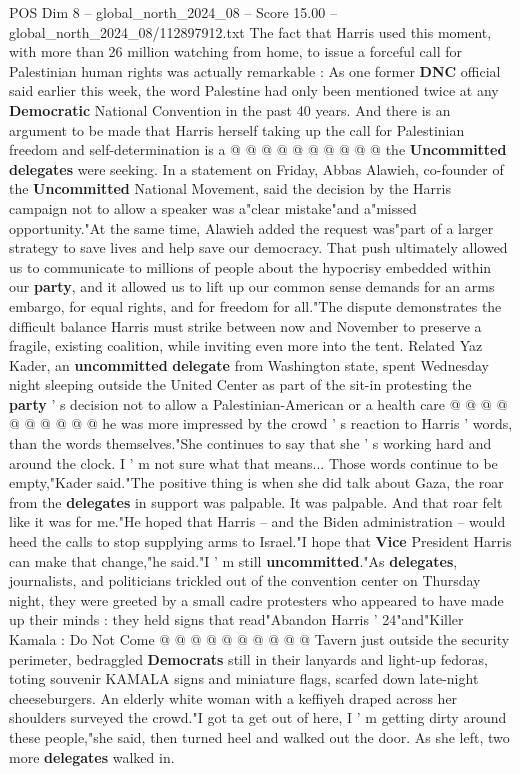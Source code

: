 \begin{textsample}{POS Dim 8 – global\_north\_2024\_08 – Score 15.00 – global\_north\_2024\_08/112897912.txt}
The fact that Harris used this moment, with more than 26 million watching from home, to issue a forceful call for Palestinian human rights was actually remarkable : As one former \textbf{DNC} official said earlier this week, the word Palestine had only been mentioned twice at any \textbf{Democratic} National Convention in the past 40 years.
And there is an argument to be made that Harris herself taking up the call for Palestinian freedom and self-determination is a @ @ @ @ @ @ @ @ @ @ the \textbf{Uncommitted} \textbf{delegates} were seeking.
In a statement on Friday, Abbas Alawieh, co-founder of the \textbf{Uncommitted} National Movement, said the decision by the Harris campaign not to allow a speaker was a"clear mistake"and a"missed opportunity."At the same time, Alawieh added the request was"part of a larger strategy to save lives and help save our democracy.
That push ultimately allowed us to communicate to millions of people about the hypocrisy embedded within our \textbf{party}, and it allowed us to lift up our common sense demands for an arms embargo, for equal rights, and for freedom for all."The dispute demonstrates the difficult balance Harris must strike between now and November to preserve a fragile, existing coalition, while inviting even more into the tent.
Related Yaz Kader, an \textbf{uncommitted} \textbf{delegate} from Washington state, spent Wednesday night sleeping outside the United Center as part of the sit-in protesting the \textbf{party} ' s decision not to allow a Palestinian-American or a health care @ @ @ @ @ @ @ @ @ @ he was more impressed by the crowd ' s reaction to Harris ' words, than the words themselves."She continues to say that she ' s working hard and around the clock.
I ' m not sure what that means...
Those words continue to be empty,"Kader said."The positive thing is when she did talk about Gaza, the roar from the \textbf{delegates} in support was palpable.
It was palpable.
And that roar felt like it was for me."He hoped that Harris -- and the Biden administration -- would heed the calls to stop supplying arms to Israel."I hope that \textbf{Vice} President Harris can make that change,"he said."I ' m still \textbf{uncommitted}."As \textbf{delegates}, journalists, and politicians trickled out of the convention center on Thursday night, they were greeted by a small cadre protesters who appeared to have made up their minds : they held signs that read"Abandon Harris ' 24"and"Killer Kamala : Do Not Come @ @ @ @ @ @ @ @ @ @ Tavern just outside the security perimeter, bedraggled \textbf{Democrats} still in their lanyards and light-up fedoras, toting souvenir KAMALA signs and miniature flags, scarfed down late-night cheeseburgers.
An elderly white woman with a keffiyeh draped across her shoulders surveyed the crowd."I got ta get out of here, I ' m getting dirty around these people,"she said, then turned heel and walked out the door.
As she left, two more \textbf{delegates} walked in.

\end{textsample}
